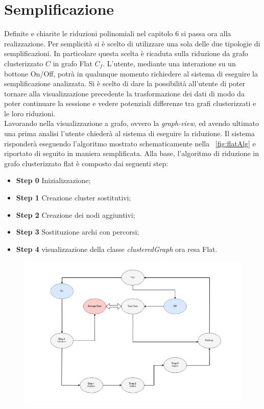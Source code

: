 {\section{Semplificazione}
Definite e chiarite le riduzioni polinomiali nel capitolo 6 si passa ora alla realizzazione. Per semplicità si è scelto di utilizzare una sola delle due tipologie di semplificazioni. In particolare questa scelta è ricaduta sulla riduzione da grafo clusterizzato $C$ in grafo Flat $C_f$.
L'utente, mediante una interazione su un bottone On/Off, potrà in qualunque momento richiedere al sistema di eseguire la semplificazione analizzata. Si è scelto di dare la possibilità all'utente di poter tornare alla visualizzazione precedente la trasformazione dei dati di modo da poter continuare la sessione e vedere potenziali differenze tra grafi clusterizzati e le loro riduzioni.\\
Lavorando nella visualizzazione a grafo, ovvero la \textit{graph-view}, ed avendo ultimato una prima analisi l'utente chiederà al sistema di eseguire la riduzione. Il sistema risponderà eseguendo l'algoritmo mostrato schematicamente nella \figurename~\ref{fig:flatAlg} e riportato di seguito in maniera semplificata. Alla base, l'algoritmo di riduzione in grafo clusterizzato flat è composto dai seguenti step:
\begin{itemize}
	\item \textbf{Step 0} Inizializzazione;
	\item \textbf{Step 1} Creazione cluster sostitutivi;
	\item \textbf{Step 2} Creazione dei nodi aggiuntivi;
	\item \textbf{Step 3} Sostituzione archi con percorsi;
	\item \textbf{Step 4} visualizzazione della classe \textit{clusteredGraph} ora resa Flat.
\end{itemize}
\begin{figure}[!htb]
	\begin{center}
		\includegraphics[width=1 \linewidth]{figure/flatAlg}

\end{center}
\end{figure}}
